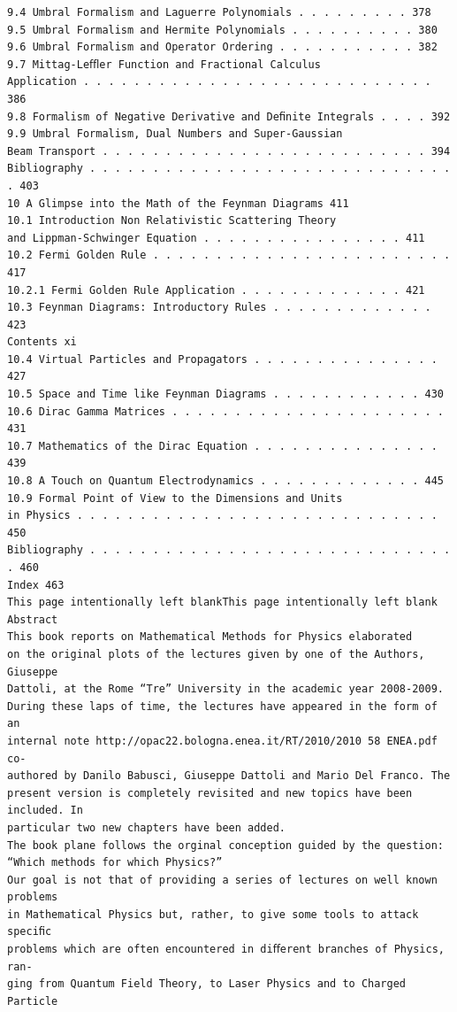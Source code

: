 \begin{verbatim}
9.4 Umbral Formalism and Laguerre Polynomials . . . . . . . . . 378
9.5 Umbral Formalism and Hermite Polynomials . . . . . . . . . . 380
9.6 Umbral Formalism and Operator Ordering . . . . . . . . . . . 382
9.7 Mittag-Leﬄer Function and Fractional Calculus
Application . . . . . . . . . . . . . . . . . . . . . . . . . . . . 386
9.8 Formalism of Negative Derivative and Deﬁnite Integrals . . . . 392
9.9 Umbral Formalism, Dual Numbers and Super-Gaussian
Beam Transport . . . . . . . . . . . . . . . . . . . . . . . . . . 394
Bibliography . . . . . . . . . . . . . . . . . . . . . . . . . . . . . . 403
10 A Glimpse into the Math of the Feynman Diagrams 411
10.1 Introduction Non Relativistic Scattering Theory
and Lippman-Schwinger Equation . . . . . . . . . . . . . . . . 411
10.2 Fermi Golden Rule . . . . . . . . . . . . . . . . . . . . . . . . 417
10.2.1 Fermi Golden Rule Application . . . . . . . . . . . . . 421
10.3 Feynman Diagrams: Introductory Rules . . . . . . . . . . . . . 423
Contents xi
10.4 Virtual Particles and Propagators . . . . . . . . . . . . . . . 427
10.5 Space and Time like Feynman Diagrams . . . . . . . . . . . . 430
10.6 Dirac Gamma Matrices . . . . . . . . . . . . . . . . . . . . . . 431
10.7 Mathematics of the Dirac Equation . . . . . . . . . . . . . . . 439
10.8 A Touch on Quantum Electrodynamics . . . . . . . . . . . . . 445
10.9 Formal Point of View to the Dimensions and Units
in Physics . . . . . . . . . . . . . . . . . . . . . . . . . . . . . 450
Bibliography . . . . . . . . . . . . . . . . . . . . . . . . . . . . . . 460
Index 463
This page intentionally left blankThis page intentionally left blank
Abstract
This book reports on Mathematical Methods for Physics elaborated
on the original plots of the lectures given by one of the Authors, Giuseppe
Dattoli, at the Rome “Tre” University in the academic year 2008-2009.
During these laps of time, the lectures have appeared in the form of an
internal note http://opac22.bologna.enea.it/RT/2010/2010 58 ENEA.pdf co-
authored by Danilo Babusci, Giuseppe Dattoli and Mario Del Franco. The
present version is completely revisited and new topics have been included. In
particular two new chapters have been added.
The book plane follows the orginal conception guided by the question:
“Which methods for which Physics?”
Our goal is not that of providing a series of lectures on well known problems
in Mathematical Physics but, rather, to give some tools to attack speciﬁc
problems which are often encountered in diﬀerent branches of Physics, ran-
ging from Quantum Field Theory, to Laser Physics and to Charged Particle

\end{verbatim}
